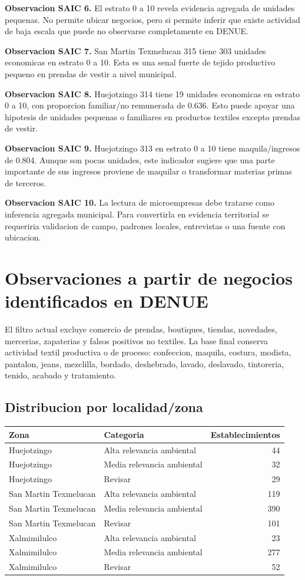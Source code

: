 \documentclass[11pt,letterpaper]{article}
\begin{document}
\textbf{Observacion SAIC 6.} El estrato 0 a 10 revela evidencia agregada de unidades pequenas. No permite ubicar negocios, pero si permite inferir que existe actividad de baja escala que puede no observarse completamente en DENUE.

\textbf{Observacion SAIC 7.} San Martin Texmelucan 315 tiene 303 unidades economicas en estrato 0 a 10. Esta es una senal fuerte de tejido productivo pequeno en prendas de vestir a nivel municipal.

\textbf{Observacion SAIC 8.} Huejotzingo 314 tiene 19 unidades economicas en estrato 0 a 10, con proporcion familiar/no remunerada de 0.636. Esto puede apoyar una hipotesis de unidades pequenas o familiares en productos textiles excepto prendas de vestir.

\textbf{Observacion SAIC 9.} Huejotzingo 313 en estrato 0 a 10 tiene maquila/ingresos de 0.804. Aunque son pocas unidades, este indicador sugiere que una parte importante de sus ingresos proviene de maquilar o transformar materias primas de terceros.

\textbf{Observacion SAIC 10.} La lectura de microempresas debe tratarse como inferencia agregada municipal. Para convertirla en evidencia territorial se requeriria validacion de campo, padrones locales, entrevistas o una fuente con ubicacion.

\section{Observaciones a partir de negocios identificados en DENUE}

El filtro actual excluye comercio de prendas, boutiques, tiendas, novedades, mercerias, zapaterias y falsos positivos no textiles. La base final conserva actividad textil productiva o de proceso: confeccion, maquila, costura, modista, pantalon, jeans, mezclilla, bordado, deshebrado, lavado, deslavado, tintoreria, tenido, acabado y tratamiento.

\subsection{Distribucion por localidad/zona}

\begin{longtable}{p{4cm}p{3.7cm}r}
\toprule
Zona & Categoria & Establecimientos \\
\midrule
Huejotzingo & Alta relevancia ambiental & 44 \\
Huejotzingo & Media relevancia ambiental & 32 \\
Huejotzingo & Revisar & 29 \\
San Martin Texmelucan & Alta relevancia ambiental & 119 \\
San Martin Texmelucan & Media relevancia ambiental & 390 \\
San Martin Texmelucan & Revisar & 101 \\
Xalmimilulco & Alta relevancia ambiental & 23 \\
Xalmimilulco & Media relevancia ambiental & 277 \\
Xalmimilulco & Revisar & 52 \\
\bottomrule
\end{longtable}
\end{document}
